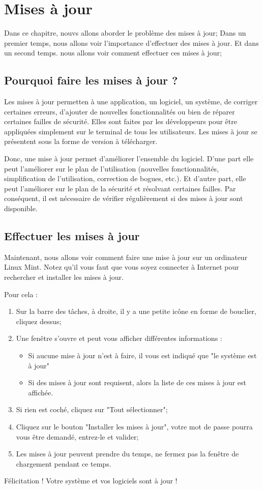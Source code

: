 \documentclass[12pt]{book}
\begin{document}
\chapter{Mises à jour}\label{sec:maj}
	Dans ce chapitre, nouvs allons aborder le problème des mises à jour;
	Dans un premier temps, nous allons voir l'importance d'effectuer des mises à jour.
	Et dans un second temps. nous allons voir comment effectuer ces mises à jour;
	\section{Pourquoi faire les mises à jour ?}
		Les mises à jour permetten à une application, un logiciel, un système, de corriger certaines erreurs, d'ajouter de nouvelles fonctionnalités ou bien de réparer certaines failles de sécurité.
		Elles sont faites par les développeurs pour être appliquées simplement sur le terminal de tous les utilisateurs.
		Les mises à jour se présentent sous la forme de version à télécharger.\par
		Donc, une mise à jour permet d'améliorer l'ensemble du logiciel.
		D'une part elle peut l'améliorer sur le plan de l'utilisation (nouvelles fonctionnalités, simplification de l'utilisation, correction de bogues, etc.).
		Et d'autre part, elle peut l'améliorer sur le plan de la sécurité et résolvant certaines failles. 
		Par conséquent, il est nécessaire de vérifier régulièrement si des mises à jour sont disponible.
	\section{Effectuer les mises à jour}
		Maintenant, nous allons voir comment faire une mise à jour sur un ordinateur Linux Mint. 
		Notez qu'il vous faut que vous soyez connecter à Internet pour rechercher et installer les mises à jour.\par
		Pour cela :
		\begin{enumerate}
			\item Sur la barre des tâches, à droite, il y a une petite icône en forme de bouclier, cliquez dessus;
			\item Une fenêtre s'ouvre et peut vous afficher différentes informations :
			\begin{itemize}
				\item Si aucune mise à jour n'est à faire, il vous est indiqué que "le système est à jour"
				\item Si des mises à jour sont requisent, alors la liste de ces mises à jour est affichée.
			\end{itemize}
			\item Si rien est coché, cliquez sur "Tout sélectionner";
			\item Cliquez sur le bouton "Installer les mises à jour", votre mot de passe pourra vous être demandé, entrez-le et valider;
			\item Les mises à jour peuvent prendre du temps, ne fermez pas la fenêtre de chargement pendant ce temps.
		\end{enumerate}
		Félicitation ! Votre système et vos logiciels sont à jour !
\end{document}
